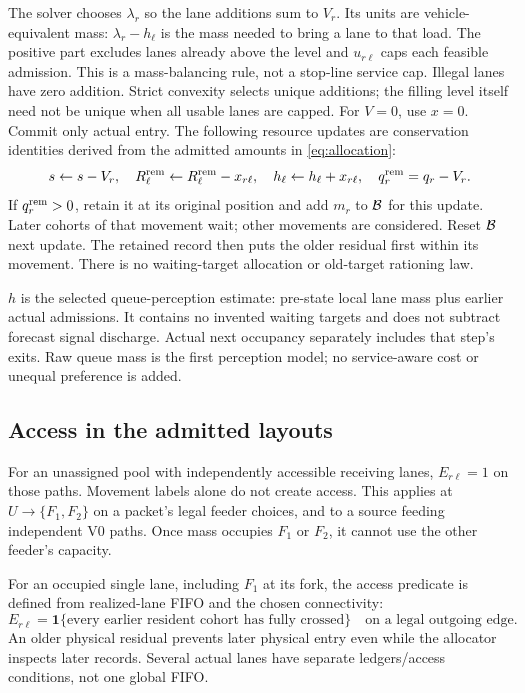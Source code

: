\documentclass[10pt,a4paper]{article}
\newcommand{\rev}[1]{{\color{revisionred}#1}}
\begin{document}
The solver chooses $\lambda_r$ so the lane additions sum to $V_r$.
Its units are vehicle-equivalent mass: $\lambda_r-h_\ell$ is the mass
needed to bring a lane to that load. The positive part excludes lanes
already above the level and $u_{r\ell}$ caps each feasible admission.
This is a mass-balancing rule, not a stop-line service cap. Illegal lanes
have zero addition. Strict convexity selects unique additions; the filling
level itself need not be unique when all usable lanes are capped.
For $V=0$, use $x=0$. Commit only actual entry.
\rev{The following resource updates are conservation identities derived from the admitted amounts in \eqref{eq:allocation}:}
\begin{equation}
 s\leftarrow s-V_r,\quad
 R^{\rm rem}_\ell\leftarrow R^{\rm rem}_\ell-x_{r\ell},\quad
 h_\ell\leftarrow h_\ell+x_{r\ell},\quad
 q_r^{\rm rem}=q_r-V_r .
 \label{eq:allocation-update}
\end{equation}
If $q_r^{\rm rem}>0$, retain it at its original position and add $m_r$
to ${\cal B}$ for this update. Later cohorts of that movement wait;
other movements are considered. Reset ${\cal B}$ next update.
The retained record then puts the older residual first within its
movement. There is no waiting-target allocation or old-target rationing law.

$h$ is the selected queue-perception estimate: pre-state local lane mass
plus earlier actual admissions. It contains no invented waiting targets
and does not subtract forecast signal discharge. Actual next occupancy
separately includes that step's exits. Raw queue mass is the first
perception model; no service-aware cost or unequal preference is added.

\subsection*{Access in the admitted layouts}

For an unassigned pool with independently accessible receiving lanes,
$E_{r\ell}=1$ on those paths. Movement labels alone do not create access.
This applies at $U\to\{F_1,F_2\}$ on a packet's legal feeder choices,
and to a source feeding independent V0 paths. Once mass occupies $F_1$
or $F_2$, it cannot use the other feeder's capacity.

For an occupied single lane, including $F_1$ at its fork,
\rev{the access predicate is defined from realized-lane FIFO and the chosen connectivity:}
\begin{equation}
 E_{r\ell}
 =\mathbf1\{\text{every earlier resident cohort has fully crossed}\}
 \quad\text{on a legal outgoing edge}.
 \label{eq:physical-access}
\end{equation}
An older physical residual prevents later physical entry even while the
allocator inspects later records. Several actual lanes have separate
ledgers/access conditions, not one global FIFO.
\end{document}
